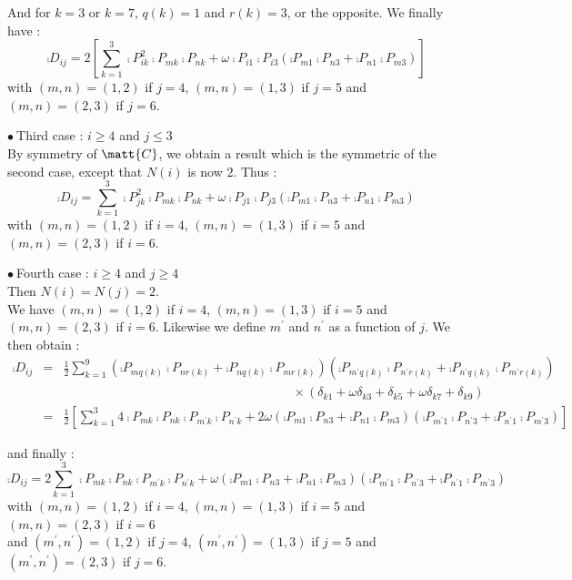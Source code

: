And for $k=3$ or $k=7$, $q(k)=1$ and $r(k)=3$, or the opposite. We finally have :
\begin{equation}
\comp{D}_{ij}=2\left[\sum_{k=1}^3
\comp{P}_{ik}^2\comp{P}_{mk}\comp{P}_{nk}
+\omega\comp{P}_{i1}\comp{P}_{i3}\left(
\comp{P}_{m1}\comp{P}_{n3}+\comp{P}_{n1}\comp{P}_{m3}\right)
\right]
\end{equation}
with $(m,n)=(1,2)$ if $j=4$, $(m,n)=(1,3)$ if $j=5$ and $(m,n)=(2,3)$ if
$j=6$.

\vspace{1cm}
$\bullet\ ${\sc Third case} : $i\geqslant 4$ and $j\leqslant 3$\\
By symmetry of $\matt{C}$, we obtain a result which is the symmetric of
the second case, except that $N(i)$ is now 2. Thus :
\begin{equation}
\comp{D}_{ij}=\sum_{k=1}^3
\comp{P}_{jk}^2\comp{P}_{mk}\comp{P}_{nk}
+\omega\comp{P}_{j1}\comp{P}_{j3}\left(
\comp{P}_{m1}\comp{P}_{n3}+\comp{P}_{n1}\comp{P}_{m3}\right)
\end{equation}
with $(m,n)=(1,2)$ if $i=4$, $(m,n)=(1,3)$ if $i=5$ and $(m,n)=(2,3)$ if
$i=6$.

\vspace{1cm}
$\bullet\ ${\sc Fourth case} : $i\geqslant 4$ and $j\geqslant 4$\\
Then $N(i)=N(j)=2$.\\
We have $(m,n)=(1,2)$ if $i=4$, $(m,n)=(1,3)$ if $i=5$ and
$(m,n)=(2,3)$ if $i=6$. Likewise we define $m^\prime$ and
$n^\prime$ as a function of $j$. We then obtain :
\begin{eqnarray}
\comp{D}_{ij}&=&\frac{1}{2}\sum_{k=1}^9
\left(\comp{P}_{mq(k)}\comp{P}_{nr(k)}+\comp{P}_{nq(k)}\comp{P}_{mr(k)}\right)
\left(\comp{P}_{m^\prime q(k)}\comp{P}_{n^\prime r(k)}
+\comp{P}_{n^\prime q(k)}\comp{P}_{m^\prime r(k)}\right)\nonumber\\
&&\qquad\qquad\qquad\qquad\qquad\qquad\qquad\qquad\qquad\times
(\delta_{k1}+\omega\delta_{k3}+\delta_{k5}+\omega\delta_{k7}+\delta_{k9})\nonumber\\
&=&\frac{1}{2}\left[
\sum_{k=1}^3 4\comp{P}_{mk}\comp{P}_{nk}
\comp{P}_{m^\prime k}\comp{P}_{n^\prime k}
+2\omega\left(\comp{P}_{m1}\comp{P}_{n3}+\comp{P}_{n1}\comp{P}_{m3}\right)
\left(\comp{P}_{m^\prime 1}\comp{P}_{n^\prime 3}
+\comp{P}_{n^\prime 1}\comp{P}_{m^\prime 3}\right)\right]
\end{eqnarray}

and finally :
\begin{equation}
\comp{D}_{ij}=
2\sum_{k=1}^3  \comp{P}_{mk}\comp{P}_{nk}
\comp{P}_{m^\prime k}\comp{P}_{n^\prime k}
+\omega\left(\comp{P}_{m1}\comp{P}_{n3}+\comp{P}_{n1}\comp{P}_{m3}\right)
\left(\comp{P}_{m^\prime 1}\comp{P}_{n^\prime 3}
+\comp{P}_{n^\prime 1}\comp{P}_{m^\prime 3}\right)
\end{equation}
with $(m,n)=(1,2)$ if $i=4$, $(m,n)=(1,3)$ if $i=5$ and $(m,n)=(2,3)$ if
$i=6$\\
and $(m^\prime ,n^\prime )=(1,2)$ if $j=4$, $(m^\prime ,n^\prime )=(1,3)$
if $j=5$ and $(m^\prime ,n^\prime )=(2,3)$ if $j=6$.



